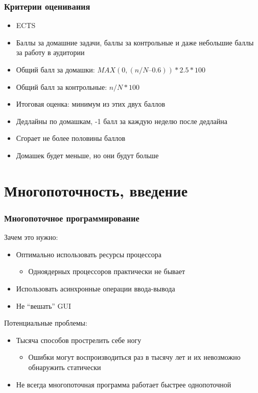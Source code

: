 \documentclass{../../slides-style}
\begin{document}
    \begin{frame}
        \frametitle{Критерии оценивания}
        \begin{itemize}
            \item ECTS
            \item Баллы за домашние задачи, баллы за контрольные и даже небольшие баллы за работу в аудитории
            \item Общий балл за домашки: $MAX(0, (n/N – 0.6)) * 2.5 * 100$
            \item Общий балл за контрольные: $n/N * 100$
            \item Итоговая оценка: минимум из этих двух баллов
            \item Дедлайны по домашкам, -1 балл за каждую неделю после дедлайна
            \item Сгорает не более половины баллов
            \item Домашек будет меньше, но они будут больше
        \end{itemize}
    \end{frame}

    \section{Многопоточность, введение}

    \begin{frame}
        \frametitle{Многопоточное программирование}
        Зачем это нужно:
        \begin{itemize}
            \item Оптимально использовать ресурсы процессора
            \begin{itemize}
                \item Одноядерных процессоров практически не бывает
            \end{itemize}
            \item Использовать асинхронные операции ввода-вывода
            \item Не ``вешать'' GUI
        \end{itemize}
        \vspace{5mm}
        Потенциальные проблемы:
        \begin{itemize}
            \item Тысяча способов прострелить себе ногу
            \begin{itemize}
                \item Ошибки могут воспроизводиться раз в тысячу лет и их невозможно обнаружить статически
            \end{itemize}
            \item Не всегда многопоточная программа работает быстрее однопоточной
        \end{itemize}
    \end{frame}
\end{document}
